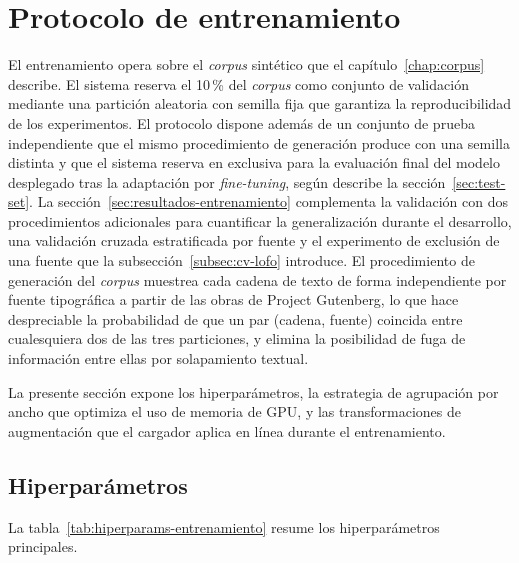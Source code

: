 \section{Protocolo de entrenamiento}
\label{sec:protocolo-entrenamiento}

El entrenamiento opera sobre el \textit{corpus} sintético que el capítulo~\ref{chap:corpus} describe. El sistema reserva el 10\,\% del \textit{corpus} como conjunto de validación mediante una partición aleatoria con semilla fija que garantiza la reproducibilidad de los experimentos. El protocolo dispone además de un conjunto de prueba independiente que el mismo procedimiento de generación produce con una semilla distinta y que el sistema reserva en exclusiva para la evaluación final del modelo desplegado tras la adaptación por \textit{fine-tuning}, según describe la sección~\ref{sec:test-set}. La sección~\ref{sec:resultados-entrenamiento} complementa la validación con dos procedimientos adicionales para cuantificar la generalización durante el desarrollo, una validación cruzada estratificada por fuente y el experimento de exclusión de una fuente que la subsección~\ref{subsec:cv-lofo} introduce. El procedimiento de generación del \textit{corpus} muestrea cada cadena de texto de forma independiente por fuente tipográfica a partir de las obras de Project Gutenberg, lo que hace despreciable la probabilidad de que un par (cadena, fuente) coincida entre cualesquiera dos de las tres particiones, y elimina la posibilidad de fuga de información entre ellas por solapamiento textual.

La presente sección expone los hiperparámetros, la estrategia de agrupación por ancho que optimiza el uso de memoria de GPU, y las transformaciones de augmentación que el cargador aplica en línea durante el entrenamiento.

\subsection{Hiperparámetros}
\label{subsec:hiperparametros}

La tabla~\ref{tab:hiperparams-entrenamiento} resume los hiperparámetros principales.

